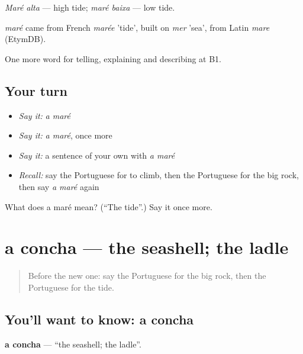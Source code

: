\emph{Maré alta} — high tide; \emph{maré baixa} — low tide.

\begin{cousinweb}
\emph{maré} came from French \emph{marée} 'tide', built on \emph{mer} 'sea', from Latin \emph{mare} (EtymDB).
\end{cousinweb}

\begin{grammarlens}[title={What you've built}]
One more word for telling, explaining and describing at B1.
\end{grammarlens}

\subsection*{Your turn}
\begin{itemize}
\raggedright
  \item \emph{Say it:} \emph{a maré}
  \item \emph{Say it:} \emph{a maré}, once more
  \item \emph{Say it:} a sentence of your own with \emph{a maré}
  \item \emph{Recall:} say the Portuguese for to climb, then the Portuguese for the big rock, then say \emph{a maré} again
\end{itemize}

\begin{tcolorbox}[breakable,colback=teal!4,colframe=teal!35!black,title={Before you move on}]
What does a maré mean? (\textquotedblleft{}The tide\textquotedblright{}.) Say it once more.
\end{tcolorbox}
\section[a concha]{a concha — the seashell; the ladle}

\label{lesson:PT-C459-concha}



\begin{quote}
Before the new one: say the Portuguese for the big rock, then the Portuguese for the tide.
\end{quote}

\subsection*{You'll want to know: a concha}
\textbf{a concha} — \textquotedblleft{}the seashell; the ladle\textquotedblright{}.

